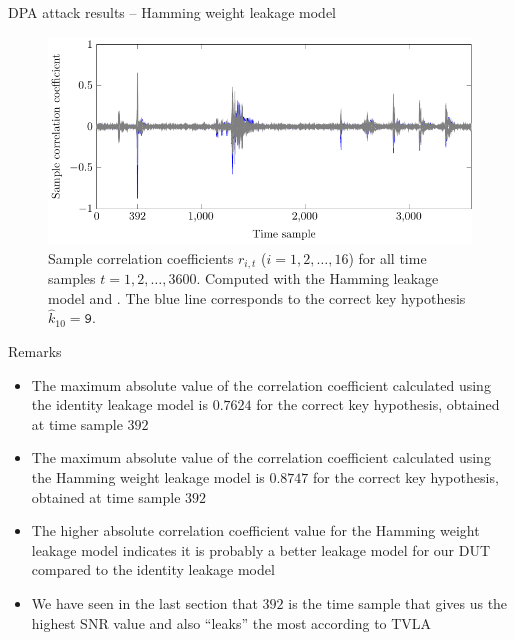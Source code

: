 \begin{frame}{DPA attack results -- Hamming weight leakage model}
    \begin{figure}[h]
    \centering
    \includegraphics{fig/correlation_coefficient_hw.pdf}
    \caption{Sample correlation coefficients $r_{i,t}$ ($i=1,2,\dots,16$) for all time samples $t=1,2,\dots,3600$.
    Computed with the Hamming leakage model and \dataranone.
    The blue line corresponds to the correct key hypothesis $\hat{k}_{10}=\texttt{9}$.}
\end{figure}
\end{frame}

\begin{frame}{Remarks}
    \begin{itemize}
        \item The maximum absolute value of the correlation coefficient calculated using the identity leakage model is $0.7624$ for the correct key hypothesis, obtained at time sample $392$
        \item The maximum absolute value of the correlation coefficient calculated using the Hamming weight leakage model is $0.8747$ for the correct key hypothesis, obtained at time sample $392$
        \item The higher absolute correlation coefficient value for the Hamming weight leakage model indicates it is probably a better leakage model for our DUT compared to the identity leakage model
        \item We have seen in the last section that $392$ is the time sample that gives us the highest SNR value and also ``leaks'' the most according to TVLA
    \end{itemize}
\end{frame}

